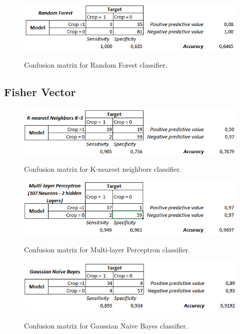 \documentclass[12pt]{article}
\numberwithin{equation}{section}
\numberwithin{table}{section}
\numberwithin{figure}{section}
\begin{document}
\begin{figure}[H] \centering
	\caption{Confusion matrix for Random Forest classifier. }
	\includegraphics[width=1\textwidth]{m5.png}
	\label{m5}
\end{figure}

\subsection{Fisher Vector}

\begin{figure}[H] \centering
	\caption{Confusion matrix for K-nearest neighbors classifier. }
	\includegraphics[width=1\textwidth]{m6.png}
	\label{m6}
\end{figure}

\begin{figure}[H] \centering
	\caption{Confusion matrix for Multi-layer Perceptron classifier. }
	\includegraphics[width=1\textwidth]{m7.png}
	\label{m7}
\end{figure}

\begin{figure}[H] \centering
	\caption{Confusion matrix for Gaussian Naive Bayes classifier. }
	\includegraphics[width=1\textwidth]{m8.png}
	\label{m8}
\end{figure}
\end{document}
